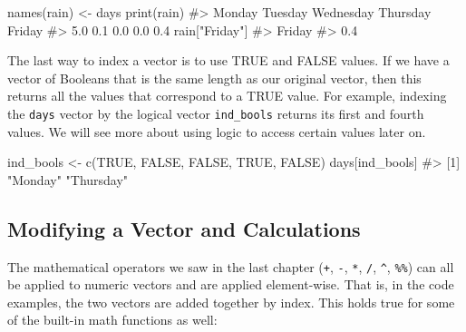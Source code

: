 \documentclass[
  letterpaper,
]{latex/krantz}
\makeatletter
\newenvironment{Shaded}{\begin{snugshade}}{\end{snugshade}}
\newcommand{\CommentTok}[1]{\textcolor[rgb]{0.37,0.37,0.37}{#1}}
\newcommand{\ConstantTok}[1]{\textcolor[rgb]{0.56,0.35,0.01}{#1}}
\newcommand{\FunctionTok}[1]{\textcolor[rgb]{0.28,0.35,0.67}{#1}}
\newcommand{\NormalTok}[1]{\textcolor[rgb]{0.00,0.23,0.31}{#1}}
\newcommand{\OtherTok}[1]{\textcolor[rgb]{0.00,0.23,0.31}{#1}}
\newcommand{\StringTok}[1]{\textcolor[rgb]{0.13,0.47,0.30}{#1}}
\newenvironment{kframe}{%
\medskip{}
\setlength{\fboxsep}{.8em}
 \def\at@end@of@kframe{}%
 \ifinner\ifhmode%
  \def\at@end@of@kframe{\end{minipage}}%
  \begin{minipage}{\columnwidth}%
 \fi\fi%
 \def\FrameCommand##1{\hskip\@totalleftmargin \hskip-\fboxsep
 \colorbox{shadecolor}{##1}\hskip-\fboxsep
     \hskip-\linewidth \hskip-\@totalleftmargin \hskip\columnwidth}%
 \MakeFramed {\advance\hsize-\width
   \@totalleftmargin\z@ \linewidth\hsize
   \@setminipage}}%
 {\par\unskip\endMakeFramed%
 \at@end@of@kframe}
\renewenvironment{Shaded}{\begin{kframe}}{\end{kframe}}
\makeatother
\begin{document}
\begin{Shaded}
\begin{Highlighting}[]
\FunctionTok{names}\NormalTok{(rain) }\OtherTok{\textless{}{-}}\NormalTok{ days}
\FunctionTok{print}\NormalTok{(rain)}
\CommentTok{\#\textgreater{}    Monday   Tuesday Wednesday  Thursday    Friday }
\CommentTok{\#\textgreater{}       5.0       0.1       0.0       0.0       0.4}
\NormalTok{rain[}\StringTok{"Friday"}\NormalTok{]}
\CommentTok{\#\textgreater{} Friday }
\CommentTok{\#\textgreater{}    0.4}
\end{Highlighting}
\end{Shaded}

The last way to index a vector is to use TRUE and FALSE values. If we
have a vector of Booleans that is the same length as our original
vector, then this returns all the values that correspond to a TRUE
value. For example, indexing the \texttt{days} vector by the logical
vector \texttt{ind\_bools} returns its first and fourth values. We will
see more about using logic to access certain values later on.

\begin{Shaded}
\begin{Highlighting}[]
\NormalTok{ind\_bools }\OtherTok{\textless{}{-}} \FunctionTok{c}\NormalTok{(}\ConstantTok{TRUE}\NormalTok{, }\ConstantTok{FALSE}\NormalTok{, }\ConstantTok{FALSE}\NormalTok{, }\ConstantTok{TRUE}\NormalTok{, }\ConstantTok{FALSE}\NormalTok{)}
\NormalTok{days[ind\_bools]}
\CommentTok{\#\textgreater{} [1] "Monday"   "Thursday"}
\end{Highlighting}
\end{Shaded}

\subsection{\texorpdfstring{Modifying a Vector and Calculations
}{Modifying a Vector and Calculations }}\label{modifying-a-vector-and-calculations}

The mathematical operators we saw in the last chapter (\texttt{+},
\texttt{-}, \texttt{*}, \texttt{/}, \texttt{\^{}}, \texttt{\%\%}) can
all be applied to numeric vectors and are applied element-wise. That is,
in the code examples, the two vectors are added together by index. This
holds true for some of the built-in math functions as well:
\end{document}
